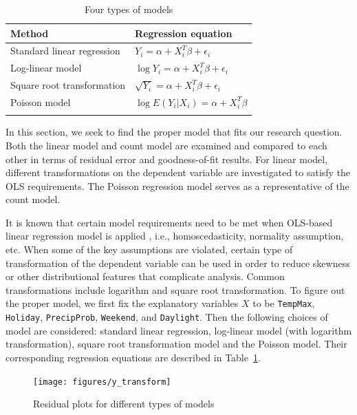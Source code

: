 \documentclass [11pt, proquest] {uwthesis}[2015/03/03]
\begin{document}
\begin{table}
\begin{center}
\caption{Four types of models}
\vspace{10pt}
\begin{tabular}{l|l} 
 \hline
Method & Regression equation \\
\hline
Standard linear regression & $Y_i=\alpha+ X_i^T \beta + \epsilon_i$ \\
Log-linear model & $\log{Y_i} = \alpha + X_i^T \beta + \epsilon_i$ \\
Square root transformation & $\sqrt{Y_i} = \alpha + X_i^T \beta + \epsilon_i$ \\
Poisson model & $\log{E(Y_i|X_i)} = \alpha +  X_i^T \beta $\\
\label{tbl:choiceofmodel}
\end{tabular}
\end{center}
\end{table}

In this section, we seek to find the proper model that fits our research question. Both the linear model and count model are examined and compared to each other in terms of residual error and goodness-of-fit results. For linear model, different transformations on the dependent variable are investigated to satisfy the OLS requirements. The Poisson regression model serves as a representative of the count model.

It is known that certain model requirements need to be met when OLS-based linear regression model is applied , i.e., homoscedasticity, normality assumption, etc. When some of the key assumptions are violated, certain type of transformation of the dependent variable can be used in order to reduce skewness or other distributional features that complicate analysis. Common transformations include logarithm and square root transformation. To figure out the proper model, we first fix the explanatory variables $X$ to be \texttt{TempMax}, \texttt{Holiday}, \texttt{PrecipProb}, \texttt{Weekend}, and \texttt{Daylight}. Then the following choices of model are considered: standard linear regression, log-linear model (with logarithm transformation), square root transformation model and the Poisson model. Their corresponding regression equations are described in Table~\ref{tbl:choiceofmodel}.


\begin{figure}
   \texttt{[image: figures/y\_transform]} 
  \caption{Residual plots for different types of models}
  \label{fig:y_transform}
\end{figure}
\end{document}
